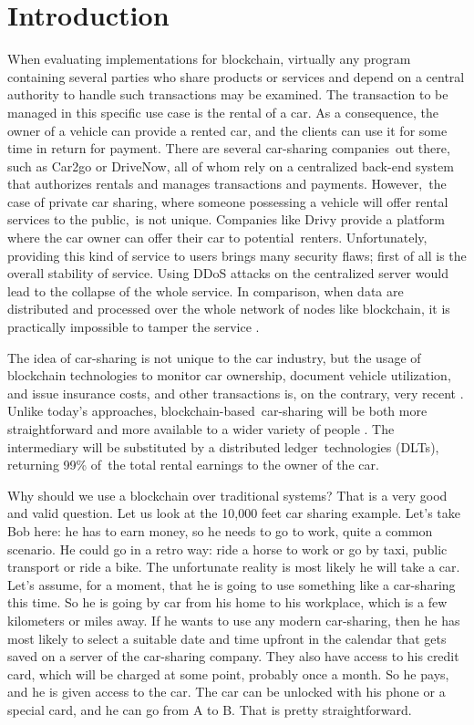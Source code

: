 \section{Introduction}

When evaluating implementations for blockchain, virtually any program containing several parties who share products or services and depend on a central authority to handle such transactions may be examined. The transaction to be managed in this specific use case is the rental of a car. As a consequence, the owner of a vehicle can provide a rented car, and the clients can use it for some time in return for payment. There are several car-sharing companies out there, such as Car2go or DriveNow, all of whom rely on a centralized back-end system that authorizes rentals and manages transactions and payments. However, the case of private car sharing, where someone possessing a vehicle will offer rental services to the public, is not unique. Companies like Drivy provide a platform where the car owner can offer their car to potential renters. Unfortunately, providing this kind of service to users brings many security flaws; first of all is the overall stability of service. Using DDoS attacks on the centralized server would lead to the collapse of the whole service. In comparison, when data are distributed and processed over the whole network of nodes like blockchain, it is practically impossible to tamper the service \cite{Nakamoto,Astarita2019}.

The idea of car-sharing is not unique to the car industry, but the usage of blockchain technologies to monitor car ownership, document vehicle utilization, and issue insurance costs, and other transactions is, on the contrary, very recent \cite{Bossauer2019UsingBI,Tsoniotis2019,Valastin2019}. Unlike today's approaches, blockchain-based car-sharing will be both more straightforward and more available to a wider variety of people \cite{Dorri2017}. The intermediary will be substituted by a distributed ledger technologies (DLTs), returning 99\% of the total rental earnings to the owner of the car.

Why should we use a blockchain over traditional systems? That is a very good and valid question. Let us look at the 10,000 feet car sharing example. Let's take Bob here: he has to earn money, so he needs to go to work, quite a common scenario. He could go in a retro way: ride a horse to work or go by taxi, public transport or ride a bike. The unfortunate reality is most likely he will take a car. Let's assume, for a moment, that he is going to use something like a car-sharing this time. So he is going by car from his home to his workplace, which is a few kilometers or miles away. If he wants to use any modern car-sharing, then he has most likely to select a suitable date and time upfront in the calendar that gets saved on a server of the car-sharing company. They also have access to his credit card, which will be charged at some point, probably once a month. So he pays, and he is given access to the car. The car can be unlocked with his phone or a special card, and he can go from A to B. That is pretty straightforward. 

